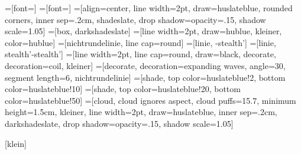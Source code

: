 =[font={\footnotesize}]
=[font={\small}]
=[align=center, line width=2pt, draw=huslateblue, rounded corners, inner
sep=.2cm, shadeslate, drop shadow={opacity=.15}, shadow scale=1.05]
=[box, darkshadeslate]
=[line width=2pt, draw=hublue, kleiner, color=hublue]
=[nichtrundelinie, line cap=round]
=[linie, -stealth']
=[linie, stealth'-stealth']
=[line width=2pt, line cap=round, draw=black, decorate,
decoration=coil, kleiner]
=[decorate, decoration={expanding waves, angle=30, segment
length=6}, nichtrundelinie]
=[shade, top color=huslateblue!2, bottom color=huslateblue!10]
=[shade, top color=huslateblue!20, bottom
color=huslateblue!50]
=[cloud, cloud ignores aspect, cloud puffs=15.7, minimum height=1.5cm, kleiner,
line width=2pt, draw=huslateblue, inner sep=.2cm, darkshadeslate,
drop shadow={opacity=.15}, shadow scale=1.05]

[klein]
